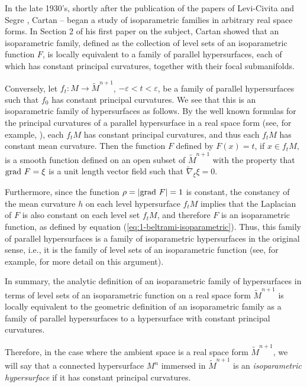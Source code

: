 \documentclass[12pt]{article}
\begin{document}
In the late 1930's, shortly after the publication of the papers of 
Levi-Civita  \cite{Lev} and Segre \cite{Seg},  
Cartan \cite{Car1}--\cite{Car4} began a study of isoparametric families in arbitrary
real space forms. 
In Section 2 of his first paper on the subject,  Cartan \cite{Car1} showed that an isoparametric family, defined as the collection of level sets of an isoparametric function $F$, is 
locally equivalent to a family of parallel hypersurfaces, each of which has constant principal curvatures, together with their focal submanifolds.  

Conversely, let $f_t:M \rightarrow \widetilde{M}^{n+1}$, $-\varepsilon < t < \varepsilon$, 
be a family of parallel hypersurfaces such that $f_0$
has constant principal curvatures.  We see that this is an isoparametric family of hypersurfaces as follows.
By the well known formulas for the principal curvatures of a parallel hypersurface in a real space form (see, for example, \cite[pp. 17--18]{CR8}), each $f_t M$ has constant principal curvatures,
and thus each $f_t M$ has constant mean curvature.  Then the function $F$ defined by
$F(x) = t$, if $x \in f_t M$, is a smooth function defined on an open subset of $\widetilde{M}^{n+1}$ with the property that
${\rm grad}\  F = \xi$ is a unit length vector field such that $\widetilde{\nabla}_{\xi} \xi = 0$. 


Furthermore,
since the function $\rho = |{\rm grad}\  F| = 1$ is constant, the constancy of the mean
curvature $h$ on each level hypersurface $f_t M$ implies that the Laplacian of $F$ is also constant
on each level set $f_t M$, and therefore $F$ is an isoparametric function, as defined by  equation 
(\ref{eq:1-beltrami-isoparametric}). Thus, this family of parallel hypersurfaces is a family of isoparametric hypersurfaces in the original sense, i.e., it is the family of level sets of an isoparametric function
(see, for example, \cite[pp. 86--91]{CR8} for more detail on this argument).

In summary, the analytic definition of an isoparametric family of hypersurfaces in terms of level sets of an isoparametric function on a real space form $\widetilde{M}^{n+1}$ 
is locally equivalent to the geometric definition of an isoparametric family as a
family of parallel hypersurfaces to a hypersurface 
with constant principal curvatures. 


Therefore, in the case where the ambient space is a real space form $\widetilde{M}^{n+1}$,
we will say that  a connected hypersurface $M^n$ immersed in $\widetilde{M}^{n+1}$ is an {\em isoparametric hypersurface} if it has constant principal curvatures. \\
\end{document}
